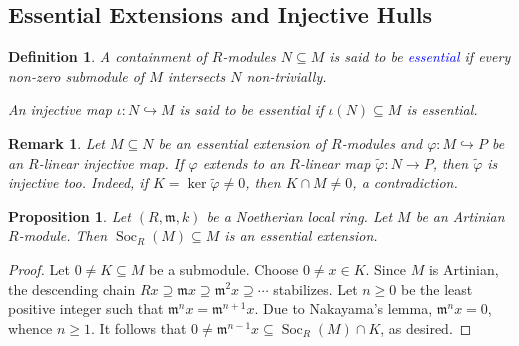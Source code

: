 \documentclass[10pt]{article}
\theoremstyle{thmstyle}
\newtheorem{proposition}[theorem]{Proposition}
\theoremstyle{defstyle}
\newtheorem{definition}[theorem]{Definition}
\newtheorem{remark}[theorem]{Remark}
\newcommand{\frakm}{\mathfrak{m}} %
\newcommand{\wt}[1]{\widetilde{#1}}
\newcommand{\into}{\hookrightarrow}
\newcommand{\define}[1]{\textcolor{blue}{\textit{#1}}}
\renewcommand{\ge}{\geqslant}
\newcommand{\Soc}{\operatorname{Soc}}
\begin{document}
\subsection{Essential Extensions and Injective Hulls}


\begin{definition}
    A containment of $R$-modules $N\subseteq M$ is said to be \define{essential} if every non-zero submodule of $M$ intersects $N$ non-trivially.

    An injective map $\iota: N\into M$ is said to be essential if $\iota(N)\subseteq M$ is essential.
\end{definition}

\begin{remark}
    Let $M\subseteq N$ be an essential extension of $R$-modules and $\varphi: M\into P$ be an $R$-linear injective map. If $\varphi$ extends to an $R$-linear map $\wt\varphi: N\to P$, then $\wt\varphi$ is injective too. Indeed, if $K = \ker\wt\varphi\ne 0$, then $K\cap M\ne 0$, a contradiction.
\end{remark}

\begin{proposition}
    Let $(R,\frakm, k)$ be a Noetherian local ring. Let $M$ be an Artinian $R$-module. Then $\Soc_R(M)\subseteq M$ is an essential extension.
\end{proposition}
\begin{proof}
    Let $0\ne K\subseteq M$ be a submodule. Choose $0\ne x\in K$. Since $M$ is Artinian, the descending chain $Rx\supseteq\frakm x\supseteq\frakm^2 x\supseteq\cdots$ stabilizes. Let $n\ge 0$ be the least positive integer such that $\frakm^n x = \frakm^{n + 1}x$. Due to Nakayama's lemma, $\frakm^n x = 0$, whence $n\ge 1$. It follows that $0\ne\frakm^{n  - 1}x\subseteq\Soc_R(M)\cap K$, as desired.
\end{proof}
\end{document}
